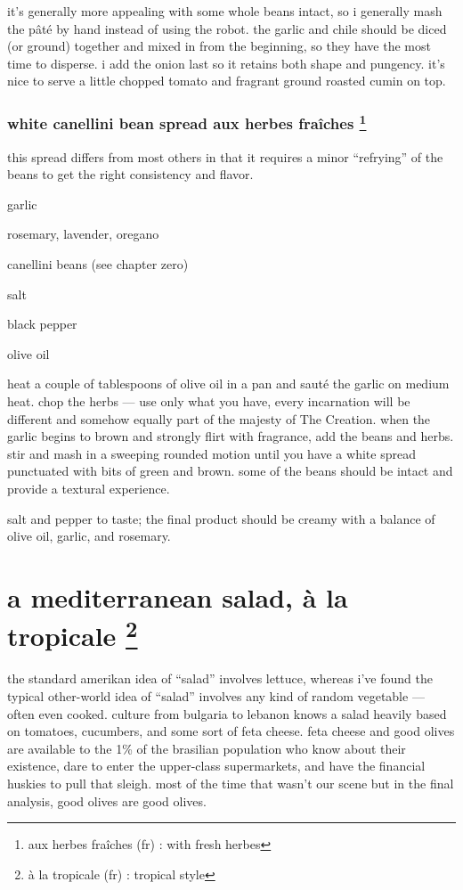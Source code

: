 it's generally more appealing with some whole beans intact, so i
generally mash the p\^{a}t\'{e} by hand instead of using the robot. the
garlic and chile should be diced (or ground) together and mixed in
from the beginning, so they have the most time to disperse. i add the
onion last so it retains both shape and pungency. it's nice to
serve a little chopped tomato and fragrant ground roasted cumin on
top.

\subsubsection{white canellini bean spread aux herbes fra\^{i}ches
\footnote{aux herbes fra\^{i}ches (fr) : with fresh herbes}}

this spread differs from most others in that it requires a minor
``refrying'' of the beans to get the right consistency and flavor.

\begin{ingredients}
  \item garlic
  \item rosemary, lavender, oregano
  \item canellini beans (see chapter zero)
  \item salt
  \item black pepper
  \item olive oil
\end{ingredients}

heat a couple of tablespoons of olive oil in a pan and saut\'{e} the
garlic on medium heat. chop the herbs --- use only what you have,
every incarnation will be different and somehow equally part of the
majesty of The Creation. when the garlic begins to brown and strongly
flirt with fragrance, add the beans and herbs. stir and mash in a
sweeping rounded motion until you have a white spread punctuated with
bits of green and brown. some of the beans should be intact and
provide a textural experience.

salt and pepper to taste; the final product should be creamy with a
balance of olive oil, garlic, and rosemary.

\section{a mediterranean salad, \`{a} la tropicale
\footnote{\`{a} la tropicale (fr) : tropical style}}

the standard amerikan idea of ``salad'' involves lettuce, whereas
i've found the typical other-world idea of ``salad'' involves
any kind of random vegetable --- often even cooked. culture from
bulgaria to lebanon knows a salad heavily based on tomatoes,
cucumbers, and some sort of feta cheese. feta cheese and good olives
are available to the 1\% of the brasilian population who know about
their existence, dare to enter the upper-class supermarkets, and have
the financial huskies to pull that sleigh. most of the time that
wasn't our scene but in the final analysis, good olives are good
olives.

